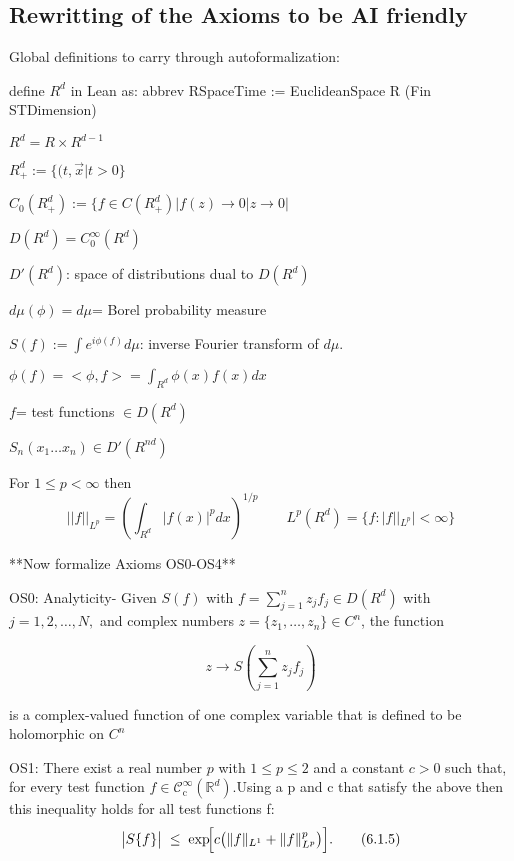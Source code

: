 \documentclass{article}
\begin{document}
\subsection{Rewritting of the Axioms to be AI friendly}

Global definitions to carry through autoformalization:

define $R^d$ in Lean as: abbrev RSpaceTime := EuclideanSpace R (Fin STDimension)

$R^d = R \times R^{d-1}$

$R_+^d:= \{(t,\vec{x}| t> 0\}$

$C_0(R_+^d):= \{ f \in C(R_+^d)| f(z) \rightarrow 0 |z \rightarrow 0|$

$D(R^d)= C_0^{\infty} (R^d)$ 

$D'(R^d)$: space of distributions dual to $D(R^d)$

$d \mu (\phi)= d \mu$= Borel probability measure

$S(f):= \int e^{i \phi(f)} d \mu$: inverse Fourier transform of $d \mu$. 

$\phi(f) = < \phi, f>= \int_{R^d }\phi(x) f(x) dx$

$f$= test functions $\in D(R^d)$

$S_n(x_1 \ldots x_n) \in D'(R^{nd})$

For $1 \leq p < \infty$ then
\begin{equation}
    || f ||_{L^p}= (\int_{R^d} |f(x)|^p dx)^{1/p} \qquad L^p(R^d)= \{f: |f||_{L^p}| < \infty \}
\end{equation}

 **Now formalize Axioms OS0-OS4**

OS0: Analyticity-  Given $S (f) $ with $f = \sum_{j=1}^n z_j f_j \in D({R^d})$ with $j= 1,2, \ldots, N, $ and complex numbers $z= \{ z_1, \ldots, z_n\} \in C^n$, the function 

\begin{equation}
    z \rightarrow S (\sum_{j=1}^n  z_j f_j )
\end{equation}

is a complex-valued function of one complex variable that is defined to be holomorphic on $C^n$ 

OS1:
There exist a real number \(p\) with \(1\le p\le 2\) and a constant \(c>0\) such that, for every test function \(f\in\mathcal{C}^{\infty}_{\mathrm c}(\mathbb{R}^{d})\).Using a p and c that satisfy the above then this inequality holds for all test functions f:
\begin{equation}\label{eq:OS1}
\bigl|S\{f\}\bigr|
\;\le\;
\exp\!\Bigl[c\bigl(\|f\|_{L^{1}}+\|f\|_{L^{p}}^p\bigr)\Bigr].
\tag{6.1.5}
\end{equation}
\end{document}
